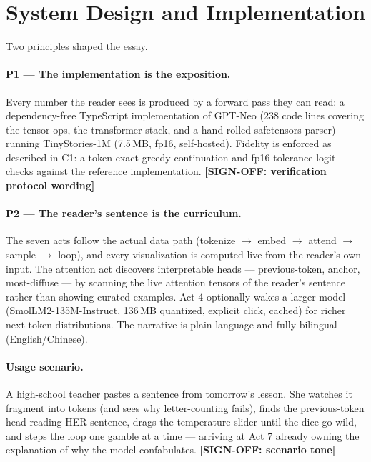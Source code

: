 \documentclass[letterpaper]{article}
\newcommand{\signoff}[1]{{\color{red!75!black}\bfseries [SIGN-OFF: #1]}}
\newcommand{\signoff}[1]{}
\begin{document}
\section{System Design and Implementation}

Two principles shaped the essay.

\paragraph{P1 --- The implementation is the exposition.}
Every number the reader sees is produced by a forward pass they can
read: a dependency-free TypeScript implementation of GPT-Neo (238 code
lines covering the tensor ops, the transformer stack, and a hand-rolled
safetensors parser) running TinyStories-1M (7.5\,MB, fp16,
self-hosted). Fidelity is enforced as described in C1: a token-exact greedy
continuation and fp16-tolerance logit checks against the reference
implementation. \signoff{verification protocol wording}

\paragraph{P2 --- The reader's sentence is the curriculum.}
The seven acts follow the actual data path (tokenize $\rightarrow$
embed $\rightarrow$ attend $\rightarrow$ sample $\rightarrow$ loop),
and every visualization is computed live from the reader's own input.
The attention act discovers interpretable heads --- previous-token,
anchor, most-diffuse --- by scanning the live attention tensors of the
reader's sentence rather than showing curated examples. Act 4
optionally wakes a larger model (SmolLM2-135M-Instruct, 136\,MB
quantized, explicit click, cached) for richer next-token distributions.
The narrative is plain-language and fully bilingual (English/Chinese).

\paragraph{Usage scenario.}
A high-school teacher pastes a sentence from tomorrow's lesson. She
watches it fragment into tokens (and sees why letter-counting fails),
finds the previous-token head reading HER sentence, drags the
temperature slider until the dice go wild, and steps the loop one
gamble at a time --- arriving at Act 7 already owning the explanation
of why the model confabulates. \signoff{scenario tone}
\end{document}
